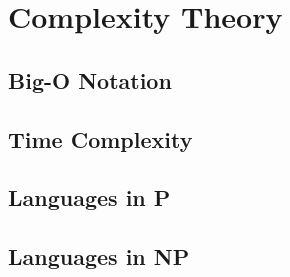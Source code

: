 \chapter{Complexity Theory}

\section{Big-O Notation}
\section{Time Complexity}
\section{Languages in P}
\section{Languages in NP}